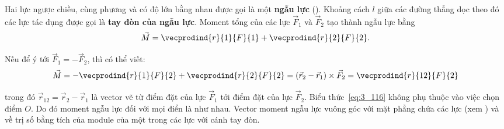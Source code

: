 Hai lực ngược chiều, cùng phương và có độ lớn bằng nhau được gọi là một \textbf{ngẫu lực} (). Khoảng cách $l$ giữa các đường thẳng dọc theo đó các lực tác dụng được  gọi là \textbf{tay đòn của ngẫu lực}. Moment tổng của các lực $\vec{F}_1$ và $\vec{F}_2$ tạo thành ngẫu lực bằng
\begin{equation*}
\vec{M} = \vecprodind{r}{1}{F}{1} + \vecprodind{r}{2}{F}{2}.
\end{equation*}

\noindent
Nếu để ý tới $\vec{F}_1=-\vec{F}_2$, thì có thể viết: 
\begin{equation}\label{eq:3_116}
\vec{M} = -\vecprodind{r}{1}{F}{2} + \vecprodind{r}{2}{F}{2} = (\vec{r}_2 - \vec{r}_1)\times\vec{F}_2 = \vecprodind{r}{12}{F}{2}
\end{equation}

\noindent
trong đó $\vec{r}_{12}=\vec{r}_2-\vec{r}_1$ là vector vẽ từ điểm đặt của lực $\vec{F}_1$ tới điểm đặt của lực $\vec{F}_2$. Biểu thức~\eqref{eq:3_116} không phụ thuộc vào việc chọn điểm $O$. Do đó moment ngẫu lực đối với mọi điển là như nhau. Vector moment ngẫu lực vuông góc với mặt phẳng chứa các lực (xem )  và về trị số bằng tích của module của một trong các lực với cánh tay đòn. 

